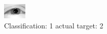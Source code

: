 \begin{figure}[h!]
\begin{center}
\includegraphics[width=0.60\columnwidth]{figures/ID2340_class_1_target_2.png}
\end{center}
\caption{ Classification: 1 actual target: 2}
\label{fig:ID2340_class_1_target_2}
\end{figure}

